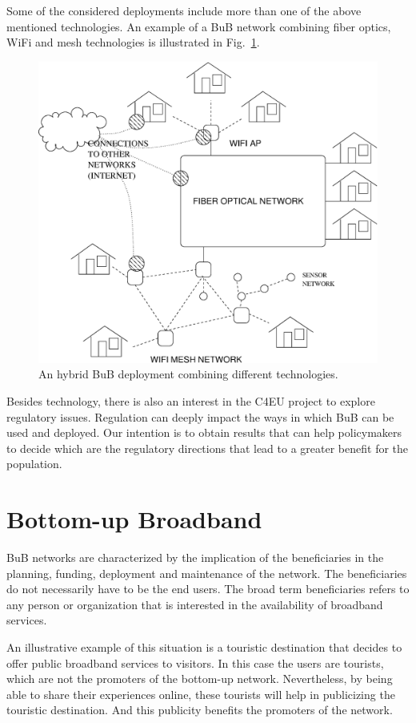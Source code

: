 \documentclass[conference]{IEEEtran}
\begin{document}
Some of the considered deployments include more than one of the above mentioned technologies.
An example of a BuB network combining fiber optics, WiFi and mesh technologies is illustrated in Fig.~\ref{fig:hybrid}.
\begin{figure}[!t]
\centering
\includegraphics[width=\linewidth]{hybrid}
\caption{An hybrid BuB deployment combining different technologies.}
\label{fig:hybrid}
\end{figure}

Besides technology, there is also an interest in the C4EU project to explore regulatory issues.
Regulation can deeply impact the ways in which BuB can be used and deployed.
Our intention is to obtain results that can help policymakers to decide which are the regulatory directions that lead to a greater benefit for the population.

\section{Bottom-up Broadband}
\label{sec:bub}

BuB networks are characterized by the implication of the beneficiaries in the planning, funding, deployment and maintenance of the network.
The beneficiaries do not necessarily have to be the end users.
The broad term beneficiaries refers to any person or organization that is interested in the availability of broadband services.

An illustrative example of this situation is a touristic destination that decides to offer public broadband services to visitors.
In this case the users are tourists, which are not the promoters of the bottom-up network.
Nevertheless, by being able to share their experiences online, these tourists will help in publicizing the touristic destination.
And this publicity benefits the promoters of the network.
\end{document}
